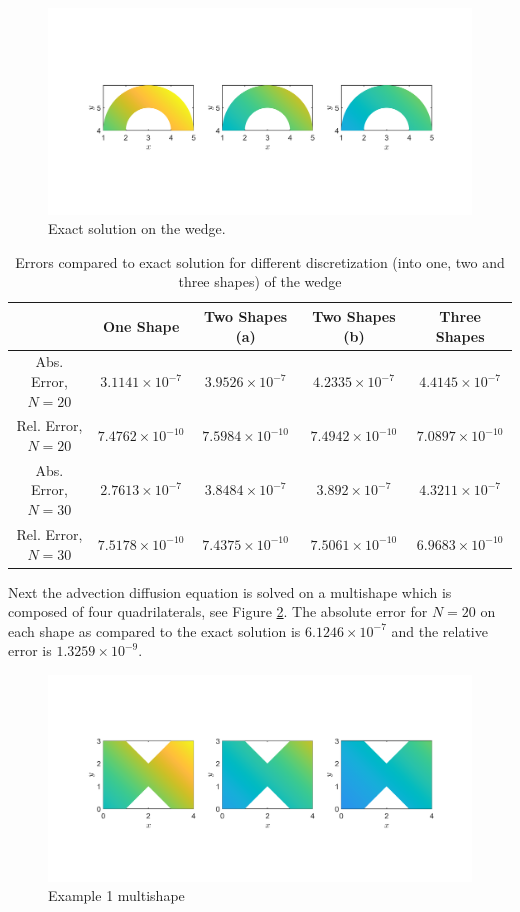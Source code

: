 \documentclass[11pt, a4paper]{article}
\theoremstyle{definition}
\begin{document}
\begin{figure}[h]
	\centering
	\includegraphics[scale=0.35]{wedgeEx.png}
	\caption{Exact solution on the wedge.} 
	\label{F5}
\end{figure}
\begin{table}
	\caption{Errors compared to exact solution for different discretization (into one, two and three shapes) of the wedge}
	\begin{tabular}{ ||c| c| c| c| c|| }
		\hline
		\hline
		& One Shape & Two Shapes (a) & Two Shapes (b)& Three Shapes\\ 
		\hline
		Abs. Error, $N =20$& $3.1141 \times 10^{-7}$ & $3.9526 \times 10^{-7}$ & $4.2335\times 10^{-7}$ & $4.4145\times 10^{-7}$\\  
		Rel. Error, $N =20$& $7.4762 \times 10^{-10}$& $7.5984 \times 10^{-10}$ &$7.4942 \times 10^{-10}$ &  $7.0897 \times 10^{-10}$\\
		Abs. Error, $N =30$& $ 2.7613\times 10^{-7}$ & $ 3.8484\times 10^{-7}$ & $3.892\times 10^{-7}$ & $4.3211\times 10^{-7}$ \\  
		Rel. Error, $N =30$ & $ 7.5178\times 10^{-10}$& $ 7.4375\times 10^{-10}$ &$7.5061\times 10^{-10}$ & $6.9683\times 10^{-10}$  \\
		\hline
		\hline
	\end{tabular}
	\label{Tab2:ErrorsExWedge}
\end{table}
Next the advection diffusion equation is solved on a multishape which is composed of four quadrilaterals, see Figure \ref{F6}. The absolute error for $N = 20$ on each shape as compared to the exact solution is $6.1246 \times 10^{-7}$ and the relative error is $1.3259 \times 10^{-9}$. 
\begin{figure}[h]
	\centering
	\includegraphics[scale=0.35]{example1.png}
	\caption{Example 1 multishape} 
	\label{F6}
\end{figure}
\end{document}
